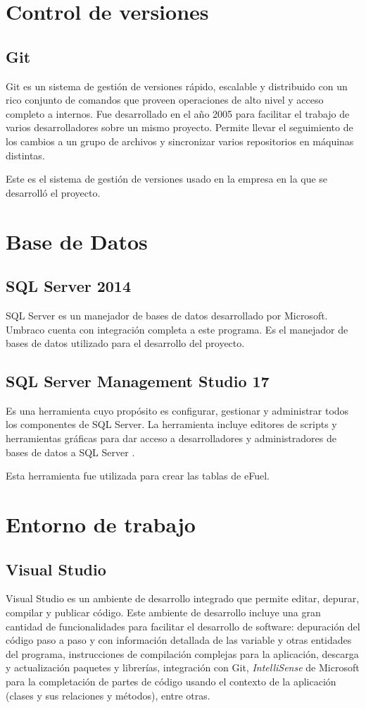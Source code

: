 \section{Control de versiones}
\subsection{Git}
Git \cite{gitGit} es un sistema de gestión de versiones rápido, escalable y distribuido con un rico conjunto de comandos que proveen operaciones de alto nivel y acceso completo a internos. Fue desarrollado en el año 2005 para facilitar el trabajo de varios desarrolladores sobre un mismo proyecto. Permite llevar el seguimiento de los cambios a un grupo de archivos y sincronizar varios repositorios en máquinas distintas.

Este es el sistema de gestión de versiones usado en la empresa en la que se desarrolló el proyecto.

\section{Base de Datos}
\subsection{SQL Server 2014}
SQL Server \cite{SQLServerMicrosoft} es un manejador de bases de datos desarrollado por Microsoft. Umbraco cuenta con integración completa a este programa. Es el manejador de bases de datos utilizado para el desarrollo del proyecto.

\subsection{SQL Server Management Studio 17}
Es una herramienta cuyo propósito es configurar, gestionar y administrar todos los componentes de SQL Server. La herramienta incluye editores de scripts y herramientas gráficas para dar acceso a desarrolladores y administradores de bases de datos a SQL Server \cite{SSMSMicrosoft}.

Esta herramienta fue utilizada para crear las tablas de eFuel.

\section{Entorno de trabajo}
\subsection{Visual Studio} \label{visualStudio}
Visual Studio \cite{visualStudioMicrosoft} es un ambiente de desarrollo integrado que permite editar, depurar, compilar y publicar código. Este ambiente de desarrollo incluye una gran cantidad de funcionalidades para facilitar el desarrollo de software: depuración del código paso a paso y con información detallada de las variable y otras entidades del programa, instrucciones de compilación complejas para la aplicación, descarga y actualización paquetes y librerías, integración con Git, \textit{IntelliSense} de Microsoft para la completación de partes de código usando el contexto de la aplicación (clases y sus relaciones y métodos), entre otras.

